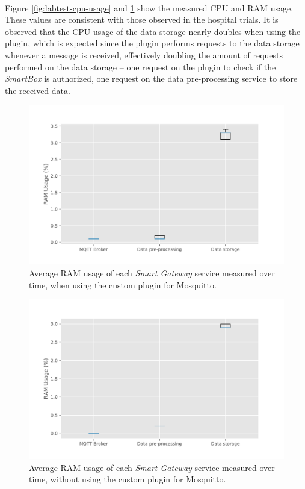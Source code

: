\paragraph{} Figure \ref{fig:labtest-cpu-usage} and \ref{fig:labtest-ram-usage} show the measured \acs{CPU} and \acs{RAM} usage. These values are consistent with those observed in the hospital trials. It is observed that the \acs{CPU} usage of the data storage nearly doubles when using the plugin, which is expected since the plugin performs requests to the data storage whenever a message is received, effectively doubling the amount of requests performed on the data storage -- one request on the plugin to check if the \textit{SmartBox} is authorized, one request on the data pre-processing service to store the received data.

\begin{figure}[H]
    \centering
    \includegraphics[width=0.85\linewidth]{images/labtest_ram_usage_with_plugin.pdf}
    \caption{Average \acs{RAM} usage of each \textit{Smart Gateway} service measured over time, when using the custom plugin for Mosquitto.}
    \label{fig:labtest-ram-usage}
\end{figure}

\begin{figure}[H]
    \centering
    \includegraphics[width=0.85\linewidth]{images/labtest_ram_usage_without_plugin.pdf}
    \caption{Average \acs{RAM} usage of each \textit{Smart Gateway} service measured over time, without using the custom plugin for Mosquitto.}
    \label{fig:labtest-ram-usage-noplug}
\end{figure}

